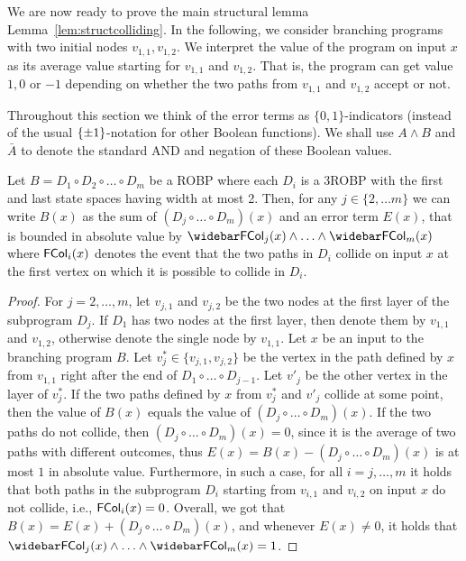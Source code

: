We are now ready to prove the main structural lemma Lemma~\ref{lem:structcolliding}. In the following, we consider branching programs with two initial nodes $v_{1,1}, v_{1,2}$. We interpret the value of the program on input $x$ as its average value starting for $v_{1,1}$ and $v_{1,2}$. That is, the program can get value $1, 0$ or $-1$ depending on whether the two paths from $v_{1,1}$ and $v_{1,2}$ accept or not.

{\color{red}Throughout this section we think of the error terms as $\{0,1\}$-indicators (instead of the usual ${\{\pm1\}}$-notation for other Boolean functions). We shall use $A \wedge B$ and $\bar{A}$ to denote the standard AND and negation of these Boolean values.
}

\begin{lemma}\label{lemma:short programs plus error term}
	Let $B =  D_1 \circ D_2  \circ \ldots \circ D_m $ be a ROBP where each $D_i$ is a 3ROBP with the first and last state spaces having width at most 2.
	Then, for any $j\in \{2, \ldots m\}$ we can write $B(x)$ as the sum of $(D_j \circ  \ldots \circ D_m)(x)$ and an error term $E(x)$, that is bounded in absolute value by $\bar{\FCol_j(x)} \wedge  \ldots \wedge \bar{\FCol_m(x)}$ where ${\mathsf{FCol}}_{i}(x)$ denotes the event that the two paths in $D_{i}$ collide on input $x$ at the first vertex on which it is possible to collide in $D_i$.
\end{lemma}
\begin{proof}
For $j=2, \ldots, m$, let $v_{j,1}$ and $v_{j,2}$ be the two nodes at the first layer of the subprogram $D_j$.
If $D_1$ has two nodes at the first layer, then denote them by $v_{1,1}$ and $v_{1,2}$, otherwise denote the single node by $v_{1,1}$. 
Let $x$ be an input to the branching program $B$.
Let $v^{*}_j \in \{v_{j,1}, v_{j,2}\}$ be the vertex in the path defined by $x$ from $v_{1,1}$ right after the end of $D_1 \circ \ldots \circ D_{j-1}$.
Let $v'_j$ be the other vertex in the layer of $v^{*}_j$.
If the two paths defined by $x$ from $v^{*}_j$ and $v'_j$ collide at some point, then the value of $B(x)$ equals the value of $(D_j \circ \ldots \circ D_m)(x)$.
If the two paths do not collide, then $(D_j \circ \ldots \circ D_m)(x) = 0$, since it is the average of two paths with different outcomes, thus $E(x)= B(x) - (D_j \circ \ldots \circ D_m)(x)$ is at most $1$ in absolute value. 
Furthermore, in such a case, for all $i = j, \ldots, m$ it holds that both paths in the subprogram $D_i$ starting from $v_{i,1}$ and $v_{i,2}$ on input $x$ do not collide, i.e., ${\mathsf{FCol}}_i(x) = 0$.
Overall, we got that $B(x) = E(x) + (D_j \circ \ldots \circ D_m)(x)$, and whenever $E(x)\neq 0$, it holds that $\bar{\FCol_j(x)} \wedge  \ldots \wedge \bar{\FCol_m(x)} =1$.
\end{proof}

